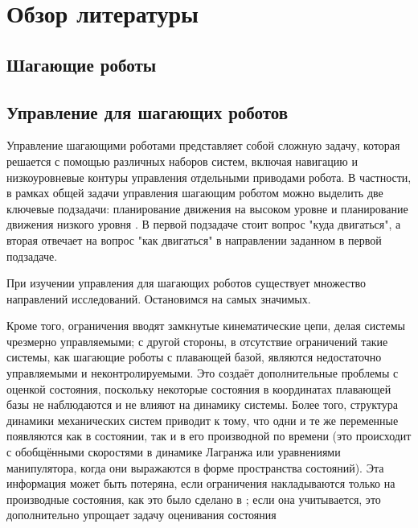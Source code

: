 \chapter{Обзор литературы}\label{ch:ch1}

\section{Шагающие роботы}\label{sec:ch1/sec1}
\section{Управление для шагающих роботов}\label{sec:ch1/sec2}
Управление шагающими роботами представляет собой сложную задачу, которая решается с помощью различных наборов систем, включая навигацию и низкоуровневые контуры управления отдельными приводами робота. В частности, в рамках общей задачи управления шагающим роботом можно выделить две ключевые подзадачи: планирование движения на высоком уровне и планирование движения низкого уровня \cite{WalkingRobots}. В первой подзадаче стоит вопрос "куда двигаться", а вторая отвечает на вопрос "как двигаться" в направлении заданном в первой подзадаче.

При изучении управления для шагающих роботов существует множество направлений исследований. Остановимся на самых значимых.


Кроме того, ограничения вводят замкнутые кинематические цепи, делая системы чрезмерно управляемыми; с другой стороны, в отсутствие ограничений такие системы, как шагающие роботы с плавающей базой, являются недостаточно управляемыми и неконтролируемыми. Это создаёт дополнительные проблемы с оценкой состояния, поскольку некоторые состояния в координатах плавающей базы не наблюдаются и не влияют на динамику системы. Более того, структура динамики механических систем приводит к тому, что одни и те же переменные появляются как в состоянии, так и в его производной по времени (это происходит с обобщёнными скоростями в динамике Лагранжа или уравнениями манипулятора, когда они выражаются в форме пространства состояний). Эта информация может быть потеряна, если ограничения накладываются только на производные состояния, как это было сделано в \cite{Mason2017}; если она учитывается, это дополнительно упрощает задачу оценивания состояния


